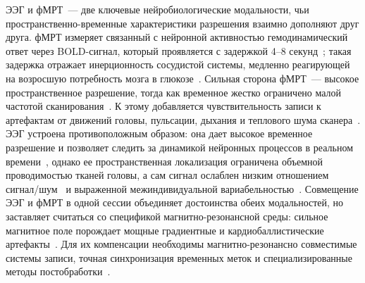 ЭЭГ и фМРТ~--- две ключевые нейробиологические модальности, чьи пространственно-временные характеристики разрешения взаимно дополняют друг друга. фМРТ измеряет связанный с нейронной активностью гемодинамический ответ через BOLD-сигнал, который проявляется с задержкой 4--8 секунд~\cite{dorin2024forecasting, Bandettini1992}; такая задержка отражает инерционность сосудистой системы, медленно реагирующей на возросшую потребность мозга в глюкозе~\cite{Ogawa1990, Logothetis2003}. Сильная сторона фМРТ~--- высокое пространственное разрешение, тогда как временное жестко ограничено малой частотой сканирования~\cite{Glover2011}. К этому добавляется чувствительность записи к артефактам от движений головы, пульсации, дыхания и теплового шума сканера~\cite{menon1999spatial, logothetis2008we}. ЭЭГ устроена противоположным образом: она дает высокое временное разрешение и позволяет следить за динамикой нейронных процессов в реальном времени~\cite{srinivasan1999methods}, однако ее пространственная локализация ограничена объемной проводимостью тканей головы, а сам сигнал ослаблен низким отношением сигнал/шум~\cite{signal_to_noise_eeg} и выраженной межиндивидуальной вариабельностью~\cite{morioka2015learning, jayaram2016transfer}. Совмещение ЭЭГ и фМРТ в одной сессии объединяет достоинства обеих модальностей, но заставляет считаться со спецификой магнитно-резонансной среды: сильное магнитное поле порождает мощные градиентные и кардиобаллистические артефакты~\cite{ritter2006simultaneous, niazy2005removal}. Для их компенсации необходимы магнитно-резонансно совместимые системы записи, точная синхронизация временных меток и специализированные методы постобработки~\cite{huster2012methods}.

